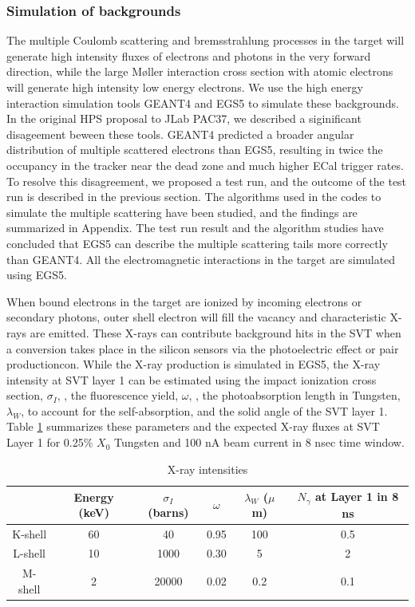 \subsubsection{Simulation of backgrounds}

The multiple Coulomb scattering and bremsstrahlung processes in the target will generate high 
intensity fluxes of electrons and photons in the very forward direction, while the large
M{\o}ller interaction cross section with atomic electrons will generate high intensity low energy
electrons. We use the high energy interaction simulation tools GEANT4 and EGS5 to simulate 
these backgrounds. In the original HPS proposal to JLab PAC37, we described a siginificant 
disageement beween these tools. GEANT4 predicted a broader angular
distribution of multiple scattered electrons than EGS5, resulting in twice the occupancy in the
tracker near the dead zone and much higher ECal trigger rates. 
To resolve this disagreement, we proposed a test run, and the outcome of the test run is described 
in the previous section. The algorithms used 
in the codes to simulate the multiple scattering have been studied, and the findings are summarized in
Appendix. The test run result and the algorithm studies have concluded that EGS5 can describe the multiple scattering 
tails more correctly than GEANT4. All the electromagnetic interactions in the target are simulated using EGS5.   

When bound electrons in the target are ionized by incoming electrons or secondary photons, outer 
shell electron will fill the vacancy and characteristic X-rays are emitted. 
These X-rays can contribute background hits in
the SVT when a conversion takes place in the silicon sensors via the photoelectric effect 
or pair productioncon. While the X-ray production is simulated in EGS5, the X-ray intensity at SVT layer 1
can be estimated using  the impact ionization 
cross section, $\sigma_I$, \cite{hoffmann}, the fluorescence yield, $\omega$, \cite{hubbell},
the photoabsorption length in Tungsten, $\lambda_W$, to account for the self-absorption, and the solid 
angle of the SVT layer 1.
Table \ref{tab:xray} summarizes these parameters and the expected X-ray
fluxes at SVT Layer 1 for 0.25\% $X_0$ Tungsten and 100 nA beam current in 8 nsec time window. 

\begin{table}[h]
\begin{center}
\begin{tabular}{|c|c|c|c|c|c|} \hline
  & Energy (keV) & $\sigma_I$ (barns) & \hspace{0.5 cm} $\omega$ \hspace{0.5 cm} & $\lambda_W$ ($\mu$m) & $N_\gamma$ at Layer 1 in 8 ns   \\ \hline
K-shell & 60 & 40 & 0.95 & 100 & 0.5 \\ \hline
L-shell  & 10 & 1000 & 0.30 & 5 & 2 \\ \hline
M-shell  & 2 & 20000 & 0.02 & 0.2 & 0.1 \\ \hline
\end{tabular}
\end{center}
\caption{\small{X-ray intensities}}
\label{tab:xray}
\end{table}

